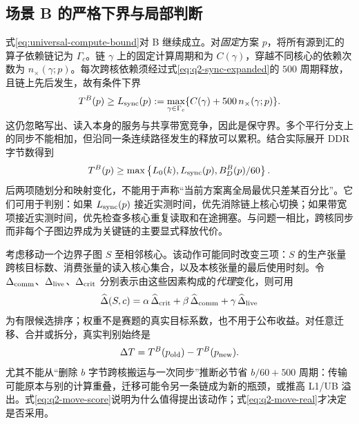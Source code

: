 \subsection{场景 B 的严格下界与局部判断}
式\eqref{eq:universal-compute-bound}对 B 继续成立。对\emph{固定}方案 $p$，将所有源到汇的算子依赖链记为 $\Gamma_c$。链 $\gamma$ 上的固定计算周期和为 $C(\gamma)$，穿越不同核心的依赖次数为 $n_{\times}(\gamma;p)$。每次跨核依赖须经过式\eqref{eq:q2-sync-expanded}的 $500$ 周期释放，且链上先后发生，故有条件下界
\begin{equation}\label{eq:q2-sync-path-lb}
T^B(p)\ge
L_{\rm sync}(p):=
\max_{\gamma\in\Gamma_c}
\{C(\gamma)+500\,n_{\times}(\gamma;p)\}.
\end{equation}
这仍忽略写出、读入本身的服务与共享带宽竞争，因此是保守界。多个平行分支上的同步不能相加，但沿同一条连续路径发生的释放可以累积。结合实际展开 DDR 字节数得到
\begin{equation}\label{eq:q2-plan-lb}
T^B(p)\ge
\max\left\{L_0(k),L_{\rm sync}(p),B_D^B(p)/60\right\}.
\end{equation}
后两项随划分和映射变化，不能用于声称“当前方案离全局最优只差某百分比”。它们可用于判别：如果 $L_{\rm sync}(p)$ 接近实测时间，优先消除链上核心切换；如果带宽项接近实测时间，优先检查多核心重复读取和在途拥塞。与问题一相比，跨核同步而非每个子图边界成为关键链的主要显式释放代价。

考虑移动一个边界子图 $S$ 至相邻核心。该动作可能同时改变三项：$S$ 的生产张量跨核目标数、消费张量的读入核心集合，以及本核张量的最后使用时刻。令 $\Delta_{\rm comm}$、$\Delta_{\rm live}$、$\Delta_{\rm crit}$ 分别表示由这些因素构成的\emph{代理}变化，则可用
\begin{equation}\label{eq:q2-move-score}
\widehat\Delta(S,c)
=\alpha\,\widehat\Delta_{\rm crit}
+\beta\,\widehat\Delta_{\rm comm}
+\gamma\,\widehat\Delta_{\rm live}
\end{equation}
为有限候选排序；权重不是赛题的真实目标系数，也不用于公布收益。对任意迁移、合并或拆分，真实判别始终是
\begin{equation}\label{eq:q2-move-real}
\Delta T=T^B(p_{\rm old})-T^B(p_{\rm new}).
\end{equation}
尤其不能从“删除 $b$ 字节跨核搬运与一次同步”推断必节省 $b/60+500$ 周期：传输可能原本与别的计算重叠，迁移可能令另一条链成为新的瓶颈，或推高 L1/UB 溢出。式\eqref{eq:q2-move-score}说明为什么值得提出该动作；式\eqref{eq:q2-move-real}才决定是否采用。
